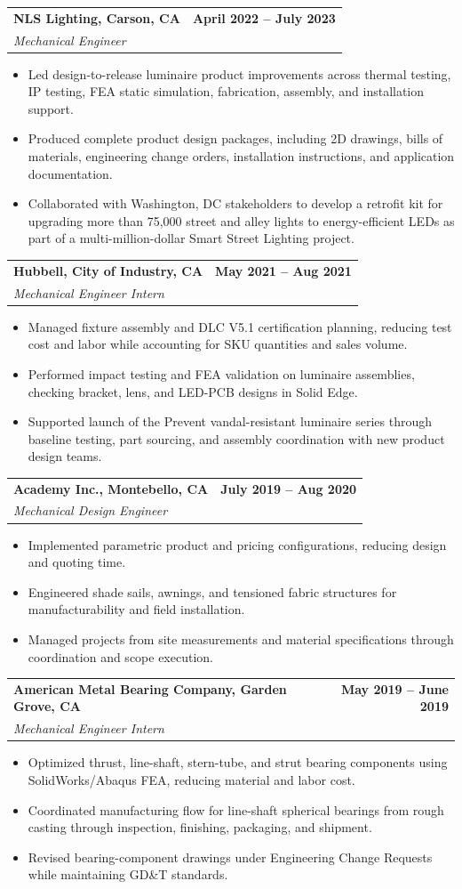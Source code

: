 \documentclass[10pt,letterpaper]{article}
\makeatletter
\newcommand{\roleentry}[4]{%
  \begin{tabularx}{\textwidth}{@{}>{\raggedright\arraybackslash}X r@{}}
    \textbf{#1} & \textbf{#2}\\
    \textit{\textcolor{muted}{#3}} & \textit{\textcolor{muted}{#4}}
  \end{tabularx}
  \vspace{-2pt}
}
\makeatother
\begin{document}
\roleentry{NLS Lighting, Carson, CA}{April 2022 -- July 2023}{Mechanical Engineer}{}
\begin{itemize}
  \item Led design-to-release luminaire product improvements across thermal testing, IP testing, FEA static simulation, fabrication, assembly, and installation support.
  \item Produced complete product design packages, including 2D drawings, bills of materials, engineering change orders, installation instructions, and application documentation.
  \item Collaborated with Washington, DC stakeholders to develop a retrofit kit for upgrading more than 75,000 street and alley lights to energy-efficient LEDs as part of a multi-million-dollar Smart Street Lighting project.
\end{itemize}

\roleentry{Hubbell, City of Industry, CA}{May 2021 -- Aug 2021}{Mechanical Engineer Intern}{}
\begin{itemize}
  \item Managed fixture assembly and DLC V5.1 certification planning, reducing test cost and labor while accounting for SKU quantities and sales volume.
  \item Performed impact testing and FEA validation on luminaire assemblies, checking bracket, lens, and LED-PCB designs in Solid Edge.
  \item Supported launch of the Prevent vandal-resistant luminaire series through baseline testing, part sourcing, and assembly coordination with new product design teams.
\end{itemize}

\roleentry{Academy Inc., Montebello, CA}{July 2019 -- Aug 2020}{Mechanical Design Engineer}{}
\begin{itemize}
  \item Implemented parametric product and pricing configurations, reducing design and quoting time.
  \item Engineered shade sails, awnings, and tensioned fabric structures for manufacturability and field installation.
  \item Managed projects from site measurements and material specifications through coordination and scope execution.
\end{itemize}

\roleentry{American Metal Bearing Company, Garden Grove, CA}{May 2019 -- June 2019}{Mechanical Engineer Intern}{}
\begin{itemize}
  \item Optimized thrust, line-shaft, stern-tube, and strut bearing components using SolidWorks/Abaqus FEA, reducing material and labor cost.
  \item Coordinated manufacturing flow for line-shaft spherical bearings from rough casting through inspection, finishing, packaging, and shipment.
  \item Revised bearing-component drawings under Engineering Change Requests while maintaining GD\&T standards.
\end{itemize}
\end{document}
